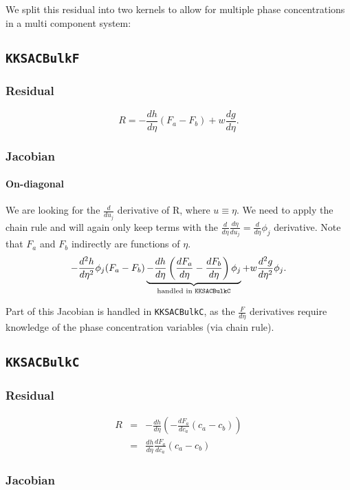\documentclass[]{article}
\begin{document}
We split this residual into two kernels to allow for multiple phase concentrations in a multi component system:

\subsection{\texttt{KKSACBulkF}}

\subsubsection{Residual}
\[
R=-\frac{dh}{d\eta}(F_a-F_b)+w\frac{dg}{d\eta}.
\]

\subsubsection{Jacobian}

\paragraph{On-diagonal}
We are looking for the $\frac d{du_j}$ derivative of R, where $u\equiv\eta$. We need to apply the chain rule and will again only keep terms with the $\frac{d}{d\eta}\frac{d\eta}{du_j}=\frac{d}{d\eta}\phi_j$ derivative. Note that $F_a$ and $F_b$ indirectly are functions of $\eta$.
\[
-\frac{d^2h}{d\eta^2}\phi_j(F_a-F_b) \underbrace{-\frac{dh}{d\eta}\left(\frac{dF_a}{d\eta}-\frac{dF_b}{d\eta}\right)\phi_j}_{\text{handled in \texttt{KKSACBulkC}}} + w\frac{d^2g}{d\eta^2}\phi_j.
\]

Part of this Jacobian is handled in \texttt{KKSACBulkC}, as the $\frac F{d\eta}$ derivatives require knowledge of the phase concentration variables (via chain rule).

\subsection{\texttt{KKSACBulkC}}

\subsubsection{Residual}
\begin{eqnarray*}
R&=&-\frac{dh}{d\eta}\left(-\frac{dF_a}{dc_a}(c_a-c_b)\right)\\
  &=&\frac{dh}{d\eta}\frac{dF_a}{dc_a}(c_a-c_b)
\end{eqnarray*}

\subsubsection{Jacobian}
\end{document}

